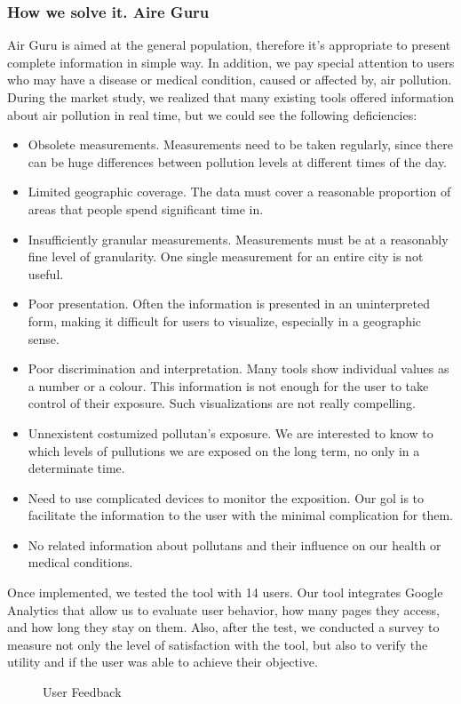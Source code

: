 \subsubsection*{How we solve it. Aire Guru} 
Air Guru is aimed at the general population, therefore it's appropriate to present complete information in simple way. In addition, we pay special attention to users who may have a
disease or medical condition, caused or affected by, air pollution.
During the market study, we realized that many existing tools offered information about air pollution in real time, but we could see the following deficiencies:
\begin{itemize}
    \item Obsolete measurements. Measurements need to be taken regularly, since there can be huge differences
    between pollution levels at different times of the day.
    \item Limited geographic coverage. The data must cover a reasonable proportion of areas that people spend significant time in.
    \item Insufficiently granular measurements. Measurements must be at a reasonably fine level of granularity. One single measurement for an entire city is not useful.
    \item Poor presentation. Often the information is presented in an uninterpreted form, making it difficult for users to visualize, especially in a geographic sense.
    \item Poor discrimination and interpretation. Many tools show individual values as a number or a colour. This information is not
    enough for the user to take control of their exposure. Such visualizations are not really compelling. 
    \item Unnexistent costumized pollutan's exposure. We are interested to know to which levels of pullutions we are exposed on the long term, no only in a determinate time.
    \item Need to use complicated devices to monitor the exposition. Our gol is to facilitate the information to the user with the minimal complication for them.
    \item No related information about pollutans and their influence on our health or medical conditions.
\end{itemize}

Once implemented, we tested the tool with 14 users. Our tool integrates Google Analytics that allow us to evaluate
user behavior, how many pages they access, and how long they stay on them. Also, after the test, we conducted a survey to measure not only the level of satisfaction with the tool, but also to verify the utility and if the user was able to achieve their objective.
\begin{figure}[ht]
    \centering
    \hfill
  
  \caption{User Feedback}
    \end{figure}
 
